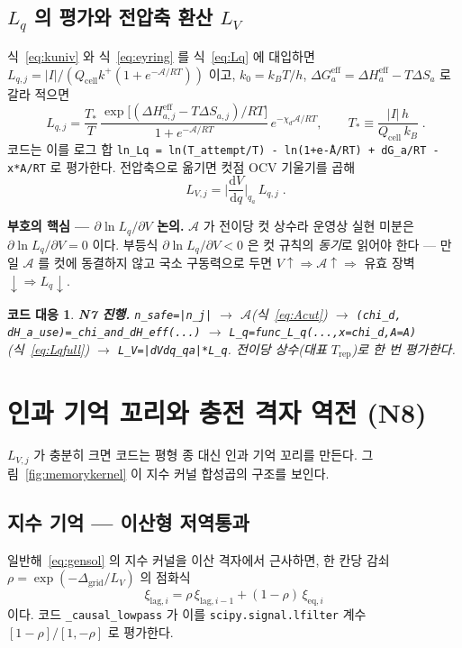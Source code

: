 \documentclass[11pt,a4paper]{article}
\newtheorem*{codebox}{코드 대응}
\newcommand{\dd}{\mathrm{d}}
\newcommand{\eff}{\mathrm{eff}}
\newcommand{\eq}{\mathrm{eq}}
\newcommand{\cell}{\mathrm{cell}}
\newcommand{\rep}{\mathrm{rep}}
\newcommand{\code}[1]{\texttt{#1}}
\begin{document}
\subsection{$L_q$ 의 평가와 전압축 환산 $L_V$}
식~\eqref{eq:kuniv} 와 식~\eqref{eq:eyring} 를 식~\eqref{eq:Lq} 에 대입하면
$L_{q,j} = |I|/(Q_\cell k^+(1+e^{-\mathcal A/RT}))$ 이고, $k_0=k_BT/h$,
$\Delta G_a^\eff = \Delta H_a^\eff - T\Delta S_a$ 로 갈라 적으면
\begin{equation}
\boxed{\;L_{q,j}=\frac{T_*}{T}\,\frac{\exp\!\big[(\Delta H_{a,j}^\eff-T\Delta S_{a,j})/RT\big]}{1+e^{-\mathcal A/RT}}
\,e^{-\chi_d\mathcal A/RT},
\qquad T_*\equiv\frac{|I|\,h}{Q_\cell\,k_B}\;.}
\label{eq:Lqfull}
\end{equation}
코드는 이를 로그 합 \code{ln\_Lq = ln(T\_attempt/T) - ln(1+e\^{-A/RT}) + dG\_a/RT - x*A/RT} 로 평가한다.
전압축으로 옮기면 컷점 OCV 기울기를 곱해
\begin{equation}
\boxed{\;L_{V,j}=\Big|\frac{\dd V}{\dd q}\Big|_{q_a}\,L_{q,j}\;.}
\label{eq:LV}
\end{equation}

\textbf{부호의 핵심 — $\partial\ln L_q/\partial V$ 논의.} $\mathcal A$ 가 전이당 컷 상수라
운영상 실현 미분은 $\partial\ln L_q/\partial V = 0$ 이다. 부등식 $\partial\ln L_q/\partial V < 0$ 은
컷 규칙의 \emph{동기}로 읽어야 한다 — 만일 $\mathcal A$ 를 컷에 동결하지 않고 국소 구동력으로 두면
$V\!\uparrow\Rightarrow\mathcal A\!\uparrow\Rightarrow$ 유효 장벽$\downarrow\Rightarrow L_q\downarrow$.

\begin{codebox}
\textbf{N7 진행.} \code{n\_safe=|n\_j|} $\to$ $\mathcal A$(식~\eqref{eq:Acut}) $\to$
\code{(chi\_d, dH\_a\_use)=\_chi\_and\_dH\_eff(...)} $\to$
\code{L\_q=func\_L\_q(...,x=chi\_d,A=A)} (식~\eqref{eq:Lqfull}) $\to$ \code{L\_V=|dVdq\_qa|*L\_q}.
전이당 상수(대표 $T_\rep$)로 한 번 평가한다.
\end{codebox}

\section{인과 기억 꼬리와 충전 격자 역전 (N8)}\label{sec:tail}
$L_{V,j}$ 가 충분히 크면 코드는 평형 종 대신 인과 기억 꼬리를 만든다.
그림~\ref{fig:memorykernel} 이 지수 커널 합성곱의 구조를 보인다.

\subsection{지수 기억 — 이산형 저역통과}
일반해~\eqref{eq:gensol} 의 지수 커널을 이산 격자에서 근사하면, 한 칸당 감쇠
$\rho = \exp(-\Delta_\mathrm{grid}/L_V)$ 의 점화식
\begin{equation}
\xi_{\mathrm{lag},i}=\rho\,\xi_{\mathrm{lag},i-1}+(1-\rho)\,\xi_{\eq,i}
\label{eq:lowpass}
\end{equation}
이다. 코드 \code{\_causal\_lowpass} 가 이를 \code{scipy.signal.lfilter} 계수
$[1-\rho]/[1,-\rho]$ 로 평가한다.
\end{document}
